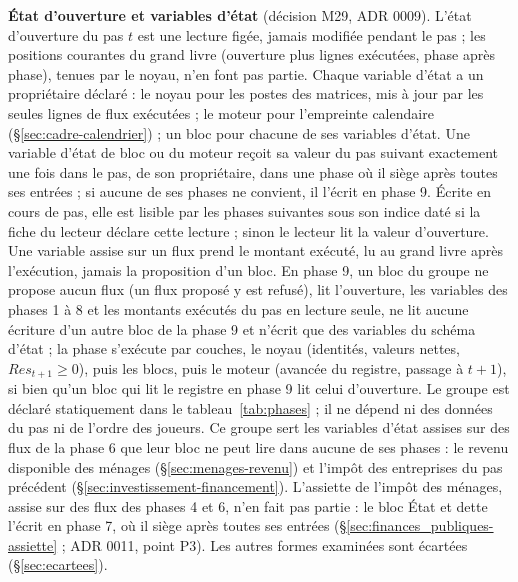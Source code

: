\documentclass[11pt,a4paper]{article}
\begin{document}
\textbf{État d'ouverture et variables d'état} (décision M29, ADR 0009). L'état d'ouverture du pas $t$ est une lecture figée, jamais modifiée pendant le pas ; les positions courantes du grand livre (ouverture plus lignes exécutées, phase après phase), tenues par le noyau, n'en font pas partie. Chaque variable d'état a un propriétaire déclaré : le noyau pour les postes des matrices, mis à jour par les seules lignes de flux exécutées ; le moteur pour l'empreinte calendaire (\S\ref{sec:cadre-calendrier}) ; un bloc pour chacune de ses variables d'état. Une variable d'état de bloc ou du moteur reçoit sa valeur du pas suivant exactement une fois dans le pas, de son propriétaire, dans une phase où il siège après toutes ses entrées ; si aucune de ses phases ne convient, il l'écrit en phase 9. Écrite en cours de pas, elle est lisible par les phases suivantes sous son indice daté si la fiche du lecteur déclare cette lecture ; sinon le lecteur lit la valeur d'ouverture. Une variable assise sur un flux prend le montant exécuté, lu au grand livre après l'exécution, jamais la proposition d'un bloc. En phase 9, un bloc du groupe ne propose aucun flux (un flux proposé y est refusé), lit l'ouverture, les variables des phases 1 à 8 et les montants exécutés du pas en lecture seule, ne lit aucune écriture d'un autre bloc de la phase 9 et n'écrit que des variables du schéma d'état ; la phase s'exécute par couches, le noyau (identités, valeurs nettes, $\mathit{Res}_{t+1} \ge 0$), puis les blocs, puis le moteur (avancée du registre, passage à $t + 1$), si bien qu'un bloc qui lit le registre en phase 9 lit celui d'ouverture. Le groupe est déclaré statiquement dans le tableau~\ref{tab:phases} ; il ne dépend ni des données du pas ni de l'ordre des joueurs. Ce groupe sert les variables d'état assises sur des flux de la phase 6 que leur bloc ne peut lire dans aucune de ses phases : le revenu disponible des ménages (\S\ref{sec:menages-revenu}) et l'impôt des entreprises du pas précédent (\S\ref{sec:investissement-financement}). L'assiette de l'impôt des ménages, assise sur des flux des phases 4 et 6, n'en fait pas partie : le bloc État et dette l'écrit en phase 7, où il siège après toutes ses entrées (\S\ref{sec:finances_publiques-assiette} ; ADR 0011, point P3). Les autres formes examinées sont écartées (\S\ref{sec:ecartees}).
\end{document}
